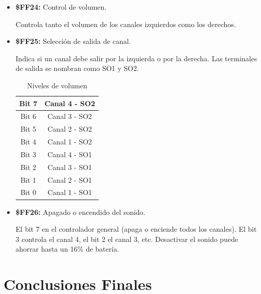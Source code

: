 	\begin{itemize}
		\item \textbf{\$FF24:} Control de volumen.
		
		Controla tanto el volumen de los canales izquierdos como los derechos.		
		
		\item \textbf{\$FF25:} Selección de salida de canal.
		
		Indica si un canal debe salir por la izquierda o por la derecha. Las terminales de salida se nombran como SO1 y SO2.
		
		\begin{table}[h!]
			\centering
			\begin{tabular}{|c|l|l|l|c|}
				\hline
				\multicolumn{4}{|c|}{Bit 7}       & Canal 4 - SO2							\\ \hline
				\multicolumn{4}{|c|}{Bit 6}       & Canal 3 - SO2								\\ \hline
				\multicolumn{4}{|c|}{Bit 5}       & Canal 2 - SO2 									\\ \hline
				\multicolumn{4}{|c|}{Bit 4}       & Canal 1 - SO2
				\\ \hline
				\multicolumn{4}{|c|}{Bit 3}       & Canal 4 - SO1
				\\ \hline
				\multicolumn{4}{|c|}{Bit 2}       & Canal 3 - SO1
				\\ \hline
				\multicolumn{4}{|c|}{Bit 1}       & Canal 2 - SO1
				\\ \hline
				\multicolumn{4}{|c|}{Bit 0}       & Canal 1 - SO1
				\\ \hline
			\end{tabular}
			\caption{Niveles de volumen}
			\label{table:vol}
		\end{table} 
		
		\item \textbf{\$FF26:} Apagado o encendido del sonido.
		
		El bit 7 en el controlador general (apaga o enciende todos los canales). El bit 3 controla el canal 4, el bit 2 el canal 3, etc. Desactivar el sonido puede ahorrar hasta un 16\% de batería.		
		
	\end{itemize}

\cleardoublepage %

\chapter{Conclusiones Finales}

